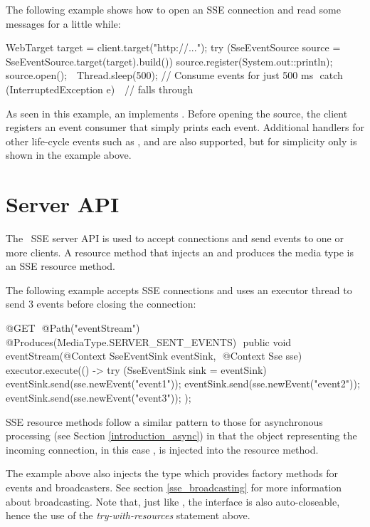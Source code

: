 The following example shows how to open an SSE connection and read some messages for a little
while:

\begin{listing}{1}
  WebTarget target = client.target("http://...");
  try (SseEventSource source = SseEventSource.target(target).build()) {
	source.register(System.out::println);
	source.open();  
	Thread.sleep(500); 		// Consume events for just 500 ms 
  } catch (InterruptedException e) { 
	// falls through 
  }
\end{listing}

As seen in this example, an  implements . Before opening the source, the client registers an event consumer that simply prints each event. Additional handlers for other life-cycle events such as ,  and  are also supported, but for simplicity only  is shown in the example above.

\section{Server API}
\label{sse_server_api}

The \jaxrs\ SSE server API is used to accept connections and send events to one or more clients. A resource method that injects an  and produces the media type  is an SSE resource method.

The following example accepts SSE connections and uses an executor thread to send 3 events before closing the connection:

\begin{listing}{1}
@GET 
@Path("eventStream") 
@Produces(MediaType.SERVER_SENT_EVENTS) 
public void eventStream(@Context SseEventSink eventSink, 
                        @Context Sse sse) {
  executor.execute(() -> {
    try (SseEventSink sink = eventSink) {  
      eventSink.send(sse.newEvent("event1"));
      eventSink.send(sse.newEvent("event2"));
      eventSink.send(sse.newEvent("event3"));
	} 
  });
}
\end{listing}

SSE resource methods follow a similar pattern to those for asynchronous processing (see Section \ref{introduction_async}) in that the object representing the incoming connection, in this case , is injected into the resource method. 

The example above also injects the  type which provides factory methods for events and broadcasters. See section \ref{sse_broadcasting} for more information about broadcasting. Note that, just like , the interface  is also auto-closeable, hence the use of the \emph{try-with-resources} statement above.

